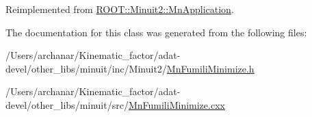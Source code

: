 Reimplemented from \mbox{\hyperlink{classROOT_1_1Minuit2_1_1MnApplication_a8908d50d5d4f7f011b94bd10e51eacf7}{R\+O\+O\+T\+::\+Minuit2\+::\+Mn\+Application}}.



The documentation for this class was generated from the following files\+:\begin{DoxyCompactItemize}
\item 
/\+Users/archanar/\+Kinematic\+\_\+factor/adat-\/devel/other\+\_\+libs/minuit/inc/\+Minuit2/\mbox{\hyperlink{adat-devel_2other__libs_2minuit_2inc_2Minuit2_2MnFumiliMinimize_8h}{Mn\+Fumili\+Minimize.\+h}}\item 
/\+Users/archanar/\+Kinematic\+\_\+factor/adat-\/devel/other\+\_\+libs/minuit/src/\mbox{\hyperlink{adat-devel_2other__libs_2minuit_2src_2MnFumiliMinimize_8cxx}{Mn\+Fumili\+Minimize.\+cxx}}\end{DoxyCompactItemize}
